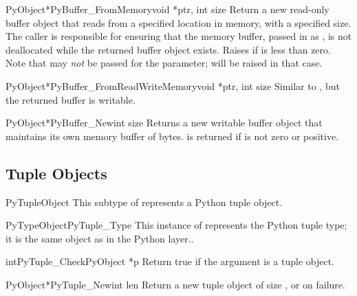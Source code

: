 \documentclass{manual}
\begin{document}
\begin{cfuncdesc}{PyObject*}{PyBuffer_FromMemory}{void *ptr, int size}
Return a new read-only buffer object that reads from a specified
location in memory, with a specified size.
The caller is responsible for ensuring that the memory buffer, passed
in as , is not deallocated while the returned buffer object
exists.  Raises  if  is less than
zero.  Note that  may \emph{not} be passed
for the  parameter;  will be raised in 
that case.
\end{cfuncdesc}

\begin{cfuncdesc}{PyObject*}{PyBuffer_FromReadWriteMemory}{void *ptr, int size}
Similar to , but the returned buffer
is writable.
\end{cfuncdesc}

\begin{cfuncdesc}{PyObject*}{PyBuffer_New}{int size}
Returns a new writable buffer object that maintains its own memory
buffer of  bytes.   is returned if
 is not zero or positive.
\end{cfuncdesc}


\subsection{Tuple Objects \label{tupleObjects}}

\begin{ctypedesc}{PyTupleObject}
This subtype of  represents a Python tuple object.
\end{ctypedesc}

\begin{cvardesc}{PyTypeObject}{PyTuple_Type}
This instance of  represents the Python tuple
type; it is the same object as  in the Python
layer..
\end{cvardesc}

\begin{cfuncdesc}{int}{PyTuple_Check}{PyObject *p}
Return true if the argument is a tuple object.
\end{cfuncdesc}

\begin{cfuncdesc}{PyObject*}{PyTuple_New}{int len}
Return a new tuple object of size , or \NULL{} on failure.
\end{cfuncdesc}
\end{document}
